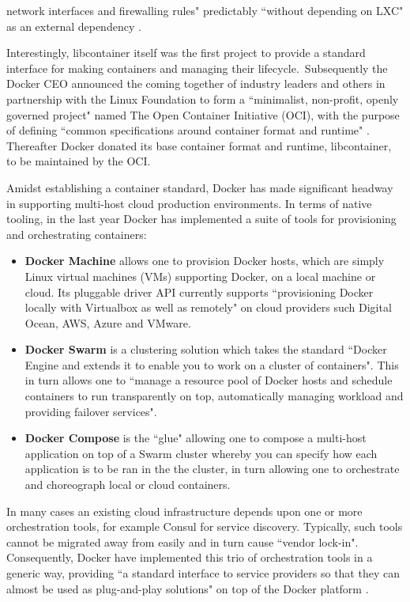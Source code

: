 \documentclass{report}
\begin{document}
network interfaces and firewalling rules" predictably ``without depending on LXC" as an external dependency \citep{Hykes}. 
\par
Interestingly, libcontainer itself was the first project to provide a standard interface for making containers and managing their lifecycle.\
Subsequently the Docker CEO  announced the coming together of industry leaders and others in partnership with the Linux Foundation
to form a ``minimalist, non-profit, openly governed project" named The Open Container Initiative (OCI), with the purpose of defining 
``common specifications around container format and runtime" \citep{Golub}. 
Thereafter Docker donated its base container format and runtime, libcontainer, to be maintained by the OCI. 
\par
Amidst establishing a container standard, Docker has made significant headway in 
supporting multi-host cloud production environments. In terms of native tooling, in the last year Docker has implemented
a suite of tools for provisioning and orchestrating containers:
\begin{itemize}
\item \textbf{Docker Machine} allows one to provision Docker hosts, which are simply Linux virtual machines (VMs) supporting Docker, on a local machine or cloud. 
Its pluggable driver API currently supports ``provisioning Docker locally with Virtualbox as well as remotely" on cloud providers such Digital Ocean, AWS, Azure and VMware.
\item \textbf{Docker Swarm} is a clustering solution which takes the standard 
``Docker Engine and extends it to enable you to work on a cluster of containers". 
This in turn allows one to ``manage a resource pool of Docker hosts and schedule
containers to run transparently on top, automatically managing workload and providing failover services".
\item \textbf{Docker Compose} is the ``glue" allowing one to compose a multi-host application on top of a Swarm cluster whereby you
can specify how each application is to be ran in the the cluster, in turn allowing one to orchestrate and choreograph local or cloud containers.
\end{itemize}
\noindent In many cases an existing cloud infrastructure depends upon one or more orchestration tools, for example 
Consul for service discovery. Typically, such tools cannot be migrated away from easily and in turn cause ``vendor lock-in".
Consequently, Docker have implemented this trio of orchestration tools in a generic way, 
providing ``a standard interface to service providers so that they can almost be used as plug-and-play solutions" on top of the Docker platform \citep{holla}.
\end{document}
